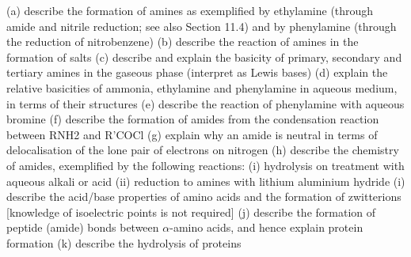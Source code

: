 \documentclass[12pt,a4 paper]{article}
\begin{document}
(a) describe the formation of amines as exemplified by ethylamine (through amide and nitrile reduction; see also Section 11.4) and by phenylamine (through the reduction of nitrobenzene)
(b) describe the reaction of amines in the formation of salts
(c) describe and explain the basicity of primary, secondary and tertiary amines in the gaseous phase (interpret
as Lewis bases)
(d) explain the relative basicities of ammonia, ethylamine and phenylamine in aqueous medium, in terms of
their structures
(e) describe the reaction of phenylamine with aqueous bromine
(f) describe the formation of amides from the condensation reaction between RNH2 and R'COCl
(g) explain why an amide is neutral in terms of delocalisation of the lone pair of electrons on nitrogen
(h) describe the chemistry of amides, exemplified by the following reactions:
(i) hydrolysis on treatment with aqueous alkali or acid
(ii) reduction to amines with lithium aluminium hydride
(i) describe the acid/base properties of amino acids and the formation of zwitterions
[knowledge of isoelectric points is not required]
(j) describe the formation of peptide (amide) bonds between $\alpha$-amino acids, and hence explain protein formation
(k) describe the hydrolysis of proteins
\end{document}
